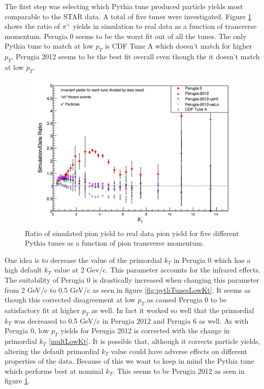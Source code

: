 \documentclass[abstract = on,listof=totoc, bibliography=totoc]{scrreprt}
\begin{document}
The first step was selecting which Pythia tune produced particle yields most comparable to the STAR data. A total of five tunes were investigated. Figure \ref{fig:piPlusPythTunes} shows the ratio of $\pi^+$ yields in simulation to real data as a function of transverse momentum. Perugia 0 seems to be the worst fit out of all the tunes. The only Pythia tune to match at low $p_T$ is CDF Tune A which doesn't match for higher $p_T$. Perugia 2012 seems to be the  best fit overall even though the it doesn't match at low $p_T$. 

\begin{figure}
\begin{center}
\includegraphics[width = .77\textwidth]{piPlusPythTunes}
\caption[]{Ratio of simulated pion yield to real data pion yield for five different Pythia tunes as a function of pion transverse momentum.}
\label{fig:piPlusPythTunes}
\end{center}
\end{figure}

One idea is to decrease the value of the primordial $k_T$ in Perugia 0 which has a high default $k_T$ value at 2 Gev/c. This parameter accounts for the infrared effects.\cite{pythTunes} The suitability of Perugia 0 is drastically increased when changing this parameter from 2 GeV/c to 0.5 GeV/c as seen in figure \ref{fig:pythTunesLowKt}. It seems as though this corrected disagreement at low $p_T$ as caused Perugia 0 to be satisfactory fit at higher $p_T$ as well. In fact it worked so well that the primordial $k_T$ was decreased to 0.5 GeV/c in Perugia 2012 and Perugia 6 as well. As with Perugia 0, low $p_T$ yields for Perugia 2012 is corrected with the change in primordial $k_T$ \ref{multLowKt}. It is possible that, although it corrects particle yields, altering the default primordial $k_T$ value could have adverse effects on different properties of the data. Because of this we want to keep in mind the Pythia tune which performs best at nominal $k_T$. This seems to be Perugia 2012 as seen in figure \ref{fig:piPlusPythTunes}.
\end{document}
